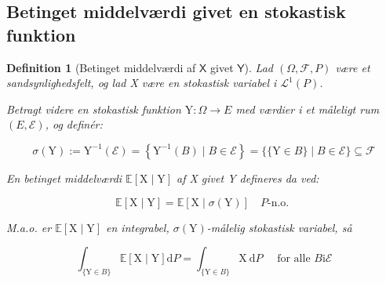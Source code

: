 \documentclass{article}
\newcommand{\1}{\mathbbm{1}}
\newcommand{\X}{\mathsf{X}}
\newcommand{\Y}{\mathsf{Y}}
\theoremstyle{boxed}
\newtheorem{definition}[theorem]{Definition}
\begin{document}
\subsection{Betinget middelværdi givet en stokastisk funktion}
\begin{theorem-box}
    \begin{definition}[Betinget middelværdi af $\X$ givet $\Y$]
        Lad $(\Omega, \mathcal{F}, P)$ være et sandsynlighedsfelt, og lad X være en stokastisk variabel i $\mathcal{L}^1(P)$.

        Betragt videre en stokastisk funktion $\mathrm{Y}: \Omega \rightarrow E$ med værdier i et måleligt rum $(E, \mathcal{E})$, og definér:
        
        $$
        \sigma(\mathrm{Y}):=\mathrm{Y}^{-1}(\mathcal{E})=\left\{\mathrm{Y}^{-1}(B) \mid B \in \mathcal{E}\right\}=\{\{\mathrm{Y} \in B\} \mid B \in \mathcal{E}\} \subseteq \mathcal{F}
        $$
        
        
        En betinget middelværdi $\mathbb{E}[\mathrm{X} \mid \mathrm{Y}]$ af X givet Y defineres da ved:
        
        $$
        \mathbb{E}[\mathrm{X} \mid \mathrm{Y}]=\mathbb{E}[\mathrm{X} \mid \sigma(\mathrm{Y})] \quad P \text {-n.o. }
        $$
        
        M.a.o. er $\mathbb{E}[\mathrm{X} \mid \mathrm{Y}]$ en integrabel, $\sigma(\mathrm{Y})$-målelig stokastisk variabel, så
        
        $$
        \int_{\{\mathrm{Y} \in B\}} \mathbb{E}[\mathrm{X} \mid \mathrm{Y}] \mathrm{d} P=\int_{\{\mathrm{Y} \in B\}} \mathrm{X} \mathrm{~d} P \quad \text { for alle } B \mathrm{i} \mathcal{E}
        $$        
    \end{definition}
\end{theorem-box}
\end{document}
